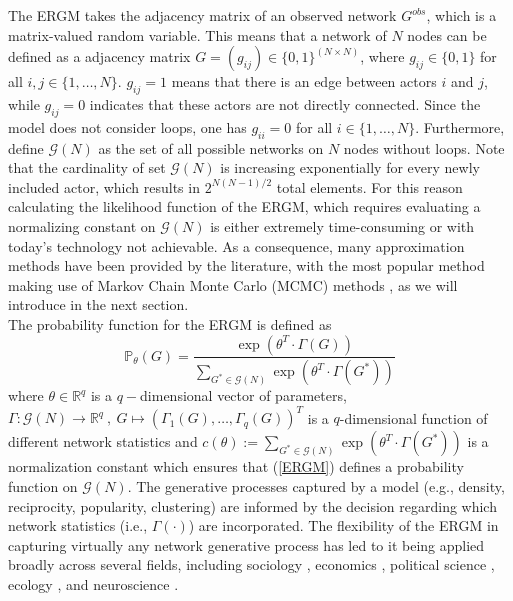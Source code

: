 \documentclass[10pt, conference, compsocconf]{IEEEtran}
\begin{document}
\indent The ERGM takes the adjacency matrix of an observed network $G^{obs}$, which is a matrix-valued random variable. This means that a network of $N$ nodes can be defined as a adjacency matrix $G=(g_{ij})\in \{0,1\}^{(N \times N)}$, where $g_{ij} \in \{0,1\}$ for all $i,j \in \{1,\dots , N\}$. $g_{ij}=1$ means that there is an edge between actors $i$ and $j$, while $g_{ij}=0$ indicates that these actors are not directly connected. Since the model does not consider loops, one has $g_{ii}=0$ for all $i \in \{1,\dots , N\}$. Furthermore, define $\mathcal{G}(N)$
as the set of all possible networks on $N$ nodes without loops. Note that the cardinality of set $\mathcal{G}(N)$ is increasing exponentially for every newly included actor, which results in $2^{N(N-1)/2}$ total elements. %
For this reason calculating the likelihood function of the ERGM, which requires evaluating a normalizing constant on $\mathcal{G}(N)$  is either extremely time-consuming or with today's technology not achievable. As a consequence, many approximation methods have been provided by the literature, with the most popular method making use of Markov Chain Monte Carlo (MCMC) methods \cite{hunter2012computational}, as we will introduce in the next section.\\
\indent The probability function for the ERGM is defined as 
\begin{equation}
\mathbb{P}_{\theta}(G)=\dfrac{\exp(\theta^T \cdot \Gamma(G))}{\sum_{G^* \in \mathcal{G}(N)} \exp(\theta^T \cdot \Gamma(G^*))} 
\label{ERGM}
\end{equation}
where $\theta \in \mathbb{R}^q$ is a $q-$dimensional vector of parameters, $\Gamma:\mathcal{G}(N) \to \mathbb{R}^q~,~G \mapsto (\Gamma_1(G),\dots,\Gamma_q(G))^T$ is a $q$-dimensional function of different network statistics and $c(\theta):= \sum_{G^* \in \mathcal{G}(N)} \exp(\theta^T \cdot \Gamma(G^*))$ is a normalization constant which ensures that (\ref{ERGM}) defines a probability function on $\mathcal{G}(N)$.
%
The generative processes captured by a model (e.g., density, reciprocity, popularity, clustering) are informed by the decision regarding which network statistics (i.e., $\Gamma(\cdot)$) are incorporated. The flexibility of the ERGM in capturing virtually any network generative process has led to it being applied broadly across several fields, including sociology \cite{smith2016ethnic}%
, economics \cite{lomi2012networks}, political science \cite{Cranmer.2011}%
, ecology \cite{dey2014individual}%
, and neuroscience \cite{simpson2011exponential}.%
\end{document}

